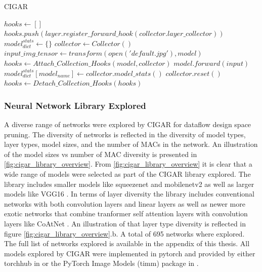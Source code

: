 \begin{algorithm}[H] 
    \caption{\ac{CIGAR}}
    \label{alg:cigar_algo}
    \begin{algorithmic}[1]
    \Statex
        \State $hooks \gets []$
                \State $hooks.push(layer.register\_forward\_hook(collector.layer\_collector))$
            \EndIf 
        \EndFor
    \State {}    
    \EndFunction
    \Statex
        \State $model^{stats}_{dict} \gets \{\}$
        \State $collector \gets Collector()$
            \State $input\_img\_tensor \gets transform(open('default.jpg'), model)$
            \State $hooks \gets Attach\_Collection\_Hooks(model, collector)$
            \State $model.forward(input)$
            \State $model^{stats}_{dict}[model_{name}] \gets collector.model\_stats()$
            \State $collector.reset()$
            \State $hooks \gets Detach\_Collection\_Hooks(hooks)$
        \EndFor
        \State {}
    \EndFunction
    \end{algorithmic}
\end{algorithm}

\subsubsection{Neural Network Library Explored}
\label{chap:dataflow_dse:pruning:cigar:library}

A diverse range of networks were explored by CIGAR for dataflow design space
pruning. The diversity of networks is reflected in the diversity of model types,
layer types, model sizes, and the number of MACs in the network. An illustration
of the model sizes vs number of MAC diversity is presented in
\autoref{fig:cigar_library_overview}. From \autoref{fig:cigar_library_overview}
it is clear that a wide range of models were selected as part of the CIGAR
library explored. The library includes smaller models like squeezenet and
mobilenetv2 as well as larger models like VGG16 \cite{dnn_is_sota_image}.
In terms of layer diversity the library includes conventional networks with both
convolution layers and linear layers as well as newer more exotic networks that
combine tranformer self attention layers with convolution layers like CoAtNet
\cite{xu_co-scale_2021}. An illustration of that layer type diversity is
reflected in figure \autoref{fig:cigar_library_overview}.b. A total of 695 networks where explored.
The full list of networks explored is available in the
appendix of this thesis. All models explored by CIGAR were implemented in
pytorch and provided by either torchhub in \cite{pytorch} or the PyTorch Image
Models (timm) package in \cite{timm}.  

